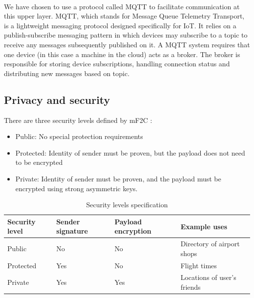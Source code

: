 \paragraph{}
We have chosen to use a protocol called MQTT to facilitate communication at this upper layer. MQTT, which stands for Message Queue Telemetry Transport, is a lightweight messaging protocol designed specifically for IoT. It relies on a publish-subscribe messaging pattern in which devices may subscribe to a topic to receive any messages subsequently published on it. A MQTT system requires that one device (in this case a machine in the cloud) acts as a broker. The broker is responsible for storing device subscriptions, handling connection status and distributing new messages based on topic.

\subsection{Privacy and security}

There are three security levels defined by mF2C \cite{mf2cwebsite}:

\begin{itemize}
    \item Public: No special protection requirements
    \item Protected: Identity of sender must be proven, but the payload does not need to be encrypted
    \item Private: Identity of sender must be proven, and the payload must be encrypted using strong asymmetric keys.
\end{itemize}

\begin{table}[h!]
    \begin{center}
        \begin{tabular}{ |p{2cm}|p{3cm}|p{3cm}|p{4cm}| }
            \hline
            Security level & Sender signature & Payload encryption & Example uses \\ \hline
            Public & No & No & Directory of airport shops \\ \hline
            Protected & Yes & No & Flight times \\ \hline
            Private & Yes & Yes & Locations of user's friends \\
            \hline
        \end{tabular}
        \caption{Security levels specification}
        \label{table:secure_levels}
    \end{center}
\end{table}

